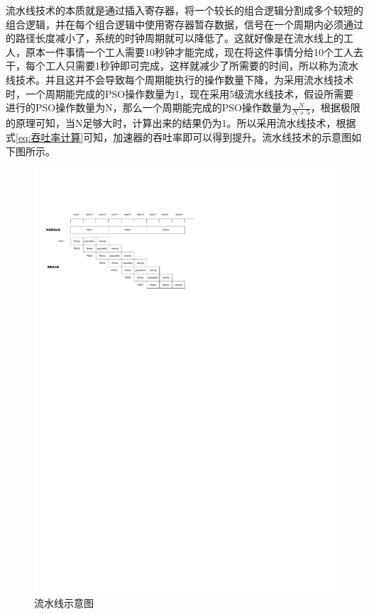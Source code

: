 流水线技术的本质就是通过插入寄存器，将一个较长的组合逻辑分割成多个较短的组合逻辑，并在每个组合逻辑中使用寄存器暂存数据，信号在一个周期内必须通过的路径长度减小了，系统的时钟周期就可以降低了。这就好像是在流水线上的工人，原本一件事情一个工人需要10秒钟才能完成，现在将这件事情分给10个工人去干，每个工人只需要1秒钟即可完成，这样就减少了所需要的时间，所以称为流水线技术。并且这并不会导致每个周期能执行的操作数量下降，为采用流水线技术时，一个周期能完成的PSO操作数量为1，现在采用5级流水线技术，假设所需要进行的PSO操作数量为N，那么一个周期能完成的PSO操作数量为$\frac{N}{N+5}$，根据极限的原理可知，当N足够大时，计算出来的结果仍为1。所以采用流水线技术，根据式\eqref{eq:吞吐率计算}可知，加速器的吞吐率即可以得到提升。流水线技术的示意图如下图所示。
\begin{figure}[htb]
    \centering
    \includegraphics[width=14cm]{fig/5-fig/流水线示意图.drawio.pdf}
    \caption{流水线示意图}
    \label{fig:流水线示意图}
  \end{figure}

